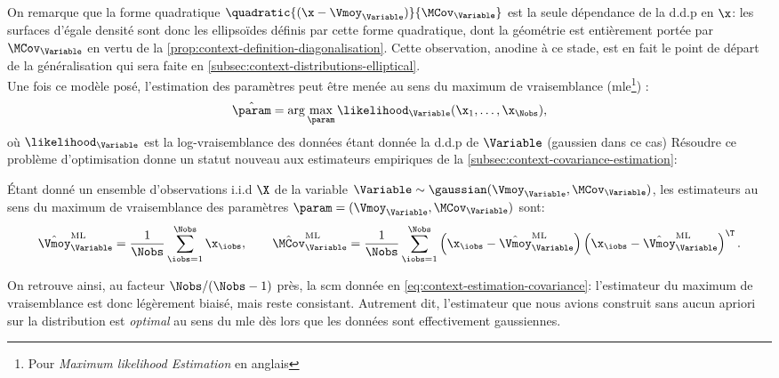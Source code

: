 On remarque que la forme quadratique $\quadratic{(\x-\Vmoy_\Variable)}{\MCov_\Variable}$ est la seule dépendance de la d.d.p en $\x$: les surfaces d'égale densité sont donc les ellipsoïdes définis par cette forme quadratique, dont la géométrie est entièrement portée par $\MCov_\Variable$ en vertu de la \cref{prop:context-definition-diagonalisation}. Cette observation, anodine à ce stade, est en fait le point de départ de la généralisation qui sera faite en \cref{subsec:context-distributions-elliptical}. \\


Une fois ce modèle posé, l'estimation des paramètres peut être menée au sens du maximum de vraisemblance (mle\footnote{Pour \emph{Maximum likelihood Estimation} en anglais}) :
\begin{equation}
  \hat{\param} = \arg \max_\param \likelihood_{\Variable}(\x_1,\dots,\x_\Nobs),
\end{equation}
où $\likelihood_\Variable$ est la log-vraisemblance des données étant donnée la d.d.p de $\Variable$ (gaussien dans ce cas) Résoudre ce problème d'optimisation donne un statut nouveau aux estimateurs empiriques de la \cref{subsec:context-covariance-estimation}:

\begin{proposition}
\label{prop:context-distributions-mlegaussian}
  \'Etant donné un ensemble d'observations i.i.d $\X$ de la variable $\Variable\sim\gaussian(\Vmoy_\Variable,\MCov_\Variable)$, les estimateurs au sens du maximum de vraisemblance des paramètres $\param=(\Vmoy_\Variable,\MCov_\Variable)$ sont:
  \begin{equation}
    \hat{\Vmoy}_\Variable^{\mathrm{ML}} = \frac{1}{\Nobs}\sum_{\iobs=1}^{\Nobs}\x_\iobs,
    \qquad
    \hat{\MCov}_\Variable^{\mathrm{ML}} = \frac{1}{\Nobs}\sum_{\iobs=1}^{\Nobs}\left(\x_\iobs-\hat{\Vmoy}_\Variable^{\mathrm{ML}}\right)\left(\x_\iobs-\hat{\Vmoy}_\Variable^{\mathrm{ML}}\right)^\T.
    \label{eq:context-distributions-mlegaussian}
  \end{equation}
\end{proposition}


\begin{remark}
  On retrouve ainsi, au facteur $\Nobs/(\Nobs-1)$ près, la scm donnée en \cref{eq:context-estimation-covariance}: l'estimateur du maximum de vraisemblance est donc légèrement biaisé, mais reste consistant. Autrement dit, l'estimateur que nous avions construit sans aucun apriori sur la distribution est \emph{optimal} au sens du mle dès lors que les données sont effectivement gaussiennes.
\end{remark}

